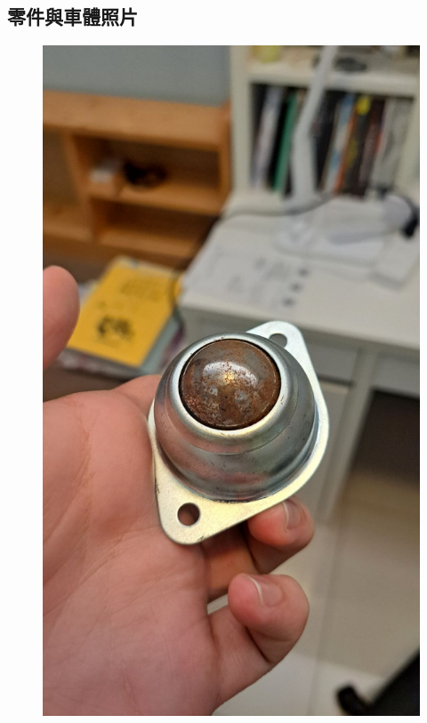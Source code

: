 \documentclass[a4paper,12pt]{article}
\begin{document}
\subsection{零件與車體照片}
\begin{center}\begin{figure}[H]\centering
\hfill
\begin{minipage}[t]{0.45\textwidth}
\centering
\includegraphics[width=\textwidth]{./photos/a.jpg}
\end{minipage}

\end{figure}
\end{center}
\end{document}
